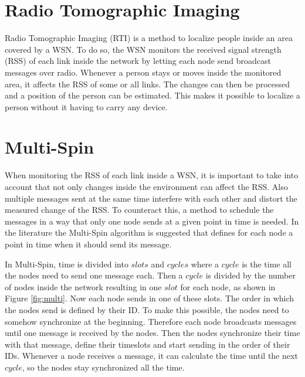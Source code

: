 

\section{Radio Tomographic Imaging}
Radio Tomographic Imaging (RTI) is a method to localize people inside an area covered by a WSN. To do so, the WSN monitors the received signal strength (RSS) of each link inside the network by letting each node send broadcast messages over radio. Whenever a person stays or moves inside the monitored area, it affects the RSS of some or all links. The changes can then be processed and a position of the person can be estimated. This makes it possible to localize a person without it having to carry any device.  \cite{RtiMulti}
\section{Multi-Spin}
When monitoring the RSS of each link inside a WSN, it is important to take into account that not only changes inside the environment can affect the RSS. Also multiple messages sent at the same time interfere with each other and distort the measured change of the RSS. To counteract this, a method to schedule the messages in a way that only one node sends at a given point in time is needed. In the literature the Multi-Spin \cite{RtiMulti} algorithm is suggested that defines for each node a point in time when it should send its message.

In Multi-Spin, time is divided into $slots$ and $cycles$ where a $cycle$ is the time all the nodes need to send one message each. Then a $cycle$ is divided by the number of nodes inside the network resulting in one $slot$ for each node, as shown in Figure \ref{fig:multi}. Now each node sends in one of these slots. The order in which the nodes send is defined by their ID. To make this possible, the nodes need to somehow synchronize at the beginning. Therefore each node broadcasts messages until one message is received by the nodes. Then the nodes synchronize their time with that message, define their timeslots and start sending in the order of their IDs. Whenever a node receives a message, it can calculate the time until the next $cycle$, so the nodes stay synchronized all the time. \cite{RtiMulti}

